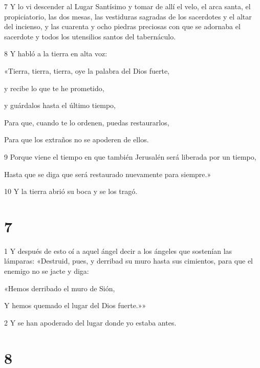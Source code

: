 \par 7 Y lo vi descender al Lugar Santísimo y tomar de allí el velo, el arca santa, el propiciatorio, las dos mesas, las vestiduras sagradas de los sacerdotes y el altar del incienso, y las cuarenta y ocho piedras preciosas con que se adornaba el sacerdote y todos los utensilios santos del tabernáculo.

\par 8 Y habló a la tierra en alta voz:

\par «Tierra, tierra, tierra, oye la palabra del Dios fuerte,

\par y recibe lo que te he prometido,

\par y guárdalos hasta el último tiempo,

\par Para que, cuando te lo ordenen, puedas restaurarlos,

\par Para que los extraños no se apoderen de ellos.

\par 9 Porque viene el tiempo en que también Jerusalén será liberada por un tiempo,

\par Hasta que se diga que será restaurado nuevamente para siempre.»

\par 10 Y la tierra abrió su boca y se los tragó.

\chapter{7}

\par 1 Y después de esto oí a aquel ángel decir a los ángeles que sostenían las lámparas: «Destruid, pues, y derribad su muro hasta sus cimientos, para que el enemigo no se jacte y diga:

\par «Hemos derribado el muro de Sión,

\par Y hemos quemado el lugar del Dios fuerte.»»

\par 2 Y se han apoderado del lugar donde yo estaba antes.

\chapter{8}

